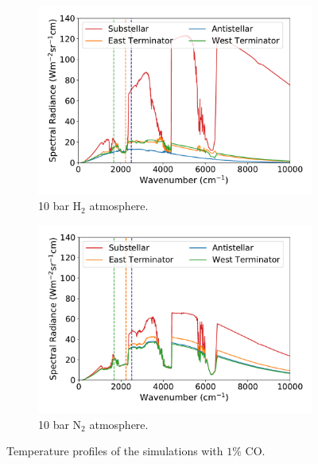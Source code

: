 \begin{figure}
  \centering
  \begin{subfigure}[t]{0.49\textwidth}
    \includegraphics[width=\textwidth]{figures/soc-lava-planets/n2-spec-olr.pdf}
    \caption{10 bar H$_{2}$ atmosphere.}\label{fig:soc-tp-h2}
  \end{subfigure}
  \begin{subfigure}[t]{0.49\textwidth}
    \includegraphics[width=\textwidth]{figures/soc-lava-planets/h2-spec-olr.pdf}
    \caption{10 bar N$_{2}$ atmosphere.}\label{fig:soc-tp-n2}
  \end{subfigure}
  \caption{Temperature profiles of the simulations with $1\%$ CO.}
  \label{fig:soc-tp}
\end{figure}

